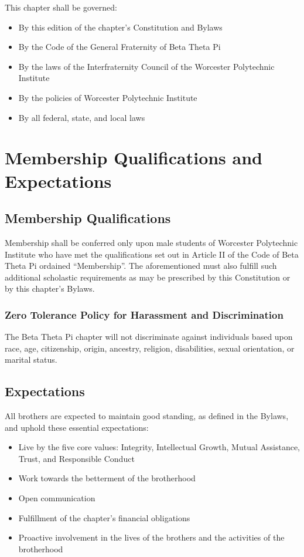 This chapter shall be governed:
\begin{itemize}
	\item By this edition of the chapter’s Constitution and Bylaws
	\item By the Code of the General Fraternity of Beta Theta Pi
	\item By the laws of the Interfraternity Council of the Worcester
		Polytechnic Institute
	\item By the policies of Worcester Polytechnic Institute
	\item By all federal, state, and local laws
\end{itemize}

\chapter{Membership Qualifications and Expectations}
\label{cha:membership-qualifications-and-expectations}

\section{Membership Qualifications}
\label{sec:membership-qualifications}

Membership shall be conferred only upon male students of Worcester Polytechnic
Institute who have met the qualifications set out in Article II of the Code of
Beta Theta Pi ordained ``Membership''.
The aforementioned must also fulfill such additional scholastic requirements as
may be prescribed by this Constitution or by this chapter’s Bylaws.

\subsection{Zero Tolerance Policy for Harassment and Discrimination} 
\label{sec:zero-tolerance-policy-for-harassment-and-discrimination}

The Beta Theta Pi chapter will not discriminate against individuals based upon
race, age, citizenship, origin, ancestry, religion, disabilities, sexual
orientation, or marital status.

\section{Expectations}
\label{sec:expectations}

All brothers are expected to maintain good standing, as defined in the Bylaws,
and uphold these essential expectations:
\begin{itemize}
	\item Live by the five core values: Integrity, Intellectual Growth, Mutual
		Assistance, Trust, and Responsible Conduct
	\item Work towards the betterment of the brotherhood
	\item Open communication
	\item Fulfillment of the chapter's financial obligations
	\item Proactive involvement in the lives of the brothers and the activities
		of the brotherhood
\end{itemize}

